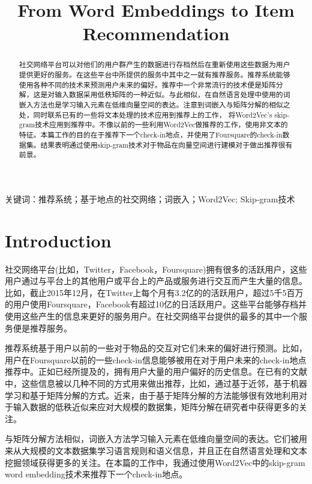 \documentclass[UTF8]{ctexart}
\title{From Word Embeddings to Item Recommendation}
\begin{document}
	\maketitle
	\begin{abstract}
		社交网络平台可以对他们的用户群产生的数据进行存档然后在重新使用这些数据为用户提供更好的服务。在这些平台中所提供的服务中其中之一就有推荐服务。推荐系统能够使用各种不同的技术来预测用户未来的偏好。推荐中一个非常流行的技术便是矩阵分解，这是对输入数据采用低秩矩阵的一种近似。与此相似，在自然语言处理中使用的词嵌入方法也是学习输入元素在低维向量空间的表达。注意到词嵌入与矩阵分解的相似之处，同时联系已有的一些将文本处理的技术应用到推荐上的工作， 将Word2Vec's skip-gram技术应用到推荐中。不像以前的一些利用Word2Vec做推荐的工作，使用非文本的特征。本篇工作的目的在于推荐下一个check-in地点，并使用了Foursquare的check-in数据集。结果表明通过使用skip-gram技术对于物品在向量空间进行建模对于做出推荐很有前景。
	\end{abstract}
	
	\begin{center}
		关键词：推荐系统；基于地点的社交网络；词嵌入；Word2Vec; Skip-gram技术
	\end{center}
	
	\section{Introduction}
	社交网络平台(比如，Twitter，Facebook，Foursquare)拥有很多的活跃用户，这些用户通过与平台上的其他用户或平台上的产品或服务进行交互而产生大量的信息。比如，截止2015年12月，在Twitter上每个月有3.2亿的的活跃用户，超过5千5百万的用户使用Foursquare，Facebook有超过10亿的日活跃用户。这些平台能够存档并使用这些产生的信息来更好的服务用户。在社交网络平台提供的最多的其中一个服务便是推荐服务。
	
	推荐系统基于用户以前的一些对于物品的交互对它们未来的偏好进行预测。比如，用户在Foursquare以前的一些check-in信息能够被用在对于用户未来的check-in地点推荐中。正如已经所提及的，拥有用户大量的用户偏好的历史信息。在已有的文献中，这些信息被以几种不同的方式用来做出推荐，比如，通过基于近邻，基于机器学习和基于矩阵分解的方式。近来，由于基于矩阵分解的方法能够很有效地利用对于输入数据的低秩近似来应对大规模的数据集\cite{ma2011recommender}，矩阵分解在研究者中获得更多的关注。
	
	与矩阵分解方法相似，词嵌入方法学习输入元素在低维向量空间的表达。它们被用来从大规模的文本数据集学习语言规则和语义信息，并且正在自然语言处理和文本挖掘领域获得更多的关注\cite{musto1441word}。在本篇的工作中，我通过使用Word2Vec\cite{mikolov2013distributed}中的skip-gram word embedding技术来推荐下一个check-in地点。
	
\end{document}
